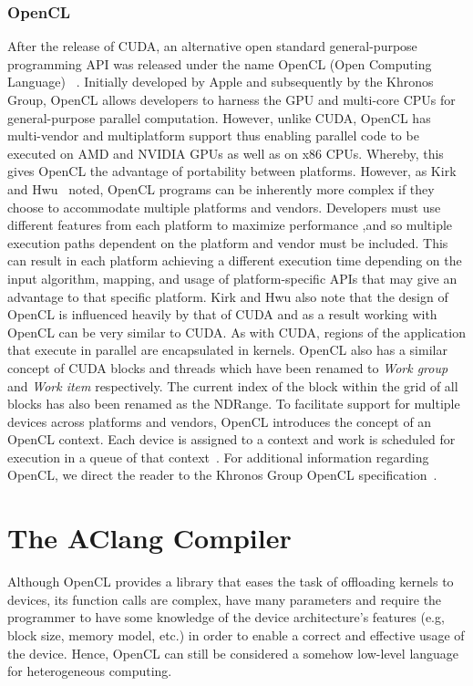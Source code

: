 \documentclass[Ingles]{ic-tese-v1}
\newcommand{\tit}[1]{{\textit{#1}}}
\begin{document}
\subsubsection{OpenCL}

After the release of CUDA, an alternative open standard general-purpose programming
API was released under the name OpenCL (Open Computing Language) ~\cite{Kirk:2012}.
Initially developed by Apple and subsequently by the Khronos Group, OpenCL allows
developers to harness the GPU and multi-core CPUs for general-purpose parallel
computation. However, unlike CUDA, OpenCL has multi-vendor and multiplatform
support thus enabling parallel code to be executed on AMD and NVIDIA GPUs
as well as on x86 CPUs. Whereby, this gives OpenCL the advantage of portability between
platforms. However, as Kirk and Hwu~\cite{Kirk:2012} noted, OpenCL programs
can be inherently more complex if they choose to accommodate multiple platforms and vendors.
Developers must use different features from each platform to maximize performance
,and so multiple execution paths dependent on the platform and vendor must be
included. This can result in each platform achieving a different execution time
depending on the input algorithm, mapping, and usage of platform-specific APIs
that may give an advantage to that specific platform. Kirk and Hwu also note
that the design of OpenCL is influenced heavily by that of CUDA and as a result
working with OpenCL can be very similar to CUDA. As with CUDA, regions of
the application that execute in parallel are encapsulated in kernels. OpenCL also
has a similar concept of CUDA blocks and threads which have been renamed to
\tit{Work group} and \tit{Work item} respectively. The current index of the block within the
grid of all blocks has also been renamed as the NDRange. To facilitate support for
multiple devices across platforms and vendors, OpenCL introduces the concept of
an OpenCL context. Each device is assigned to a context and work is scheduled
for execution in a queue of that context~\cite{Kirk:2012}. For additional information
regarding OpenCL, we direct the reader to the Khronos Group OpenCL
specification~\cite{opencl}.

\section{The AClang Compiler}
\label{sec:AClang}

Although OpenCL provides  a library that eases the  task of offloading
kernels  to  devices,  its  function  calls  are  complex,  have  many
parameters and  require the programmer  to have some knowledge  of the
device architecture's  features (e.g, block size,  memory model, etc.)
in order to enable a correct and effective usage of the device. Hence,
OpenCL  can  still  be  considered a  somehow  low-level  language  for
heterogeneous computing.
\end{document}
